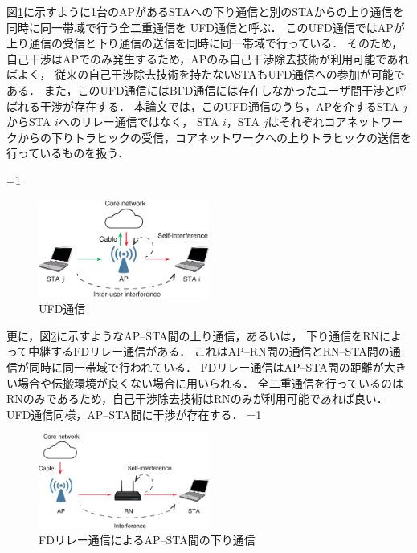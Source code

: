 \documentclass[master]{kuisthesis}		%
\newcounter{flagFig}
\begin{document}
			\par
			図\ref{fig:model_ufd}に示すように1台のAPがあるSTAへの下り通信と別のSTAからの上り通信を同時に同一帯域で行う全二重通信を
			UFD通信と呼ぶ．
			このUFD通信ではAPが上り通信の受信と下り通信の送信を同時に同一帯域で行っている．
			そのため，自己干渉はAPでのみ発生するため，APのみ自己干渉除去技術が利用可能であればよく，
			従来の自己干渉除去技術を持たないSTAもUFD通信への参加が可能である．
			また，このUFD通信にはBFD通信には存在しなかったユーザ間干渉と呼ばれる干渉が存在する．
			本論文では，このUFD通信のうち，APを介するSTA $j$からSTA $i$へのリレー通信ではなく，
			STA $i$，STA $j$はそれぞれコアネットワークからの下りトラヒックの受信，コアネットワークへの上りトラヒックの送信を行っているものを扱う．

			\ifnum\value{flagFig}=1 {\begin{figure}[htbp]
				\begin{center}
					\includegraphics[width=0.5\textwidth]{fig/ufd.eps}
					\caption{UFD通信}
					\label{fig:model_ufd}
				\end{center}
			\end{figure}}\fi
			\par
			更に，図\ref{fig:model_relay}に示すようなAP--STA間の上り通信，あるいは，
			下り通信をRNによって中継するFDリレー通信がある．
			これはAP--RN間の通信とRN--STA間の通信が同時に同一帯域で行われている．
			FDリレー通信はAP--STA間の距離が大きい場合や伝搬環境が良くない場合に用いられる．
			全二重通信を行っているのはRNのみであるため，自己干渉除去技術はRNのみが利用可能であれば良い．
			UFD通信同様，AP--STA間に干渉が存在する．
			\ifnum\value{flagFig}=1 {\begin{figure}[htbp]
				\begin{center}
					\includegraphics[width=0.5\textwidth]{fig/model_relay.eps}
					\caption{FDリレー通信によるAP--STA間の下り通信}
					\label{fig:model_relay}
				\end{center}
			\end{figure}}\fi
\end{document}
